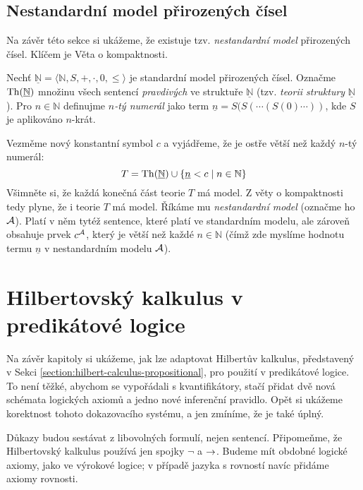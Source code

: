 \subsection{Nestandardní model přirozených čísel}

Na závěr této sekce si ukážeme, že existuje tzv. \emph{nestandardní model} přirozených čísel. Klíčem je Věta o kompaktnosti.
    
Nechť $\underline{\mathbb N}=\langle\mathbb N,S,+,\cdot,0,\leq\rangle$ je standardní model přirozených čísel. Označme $\operatorname{Th}(\underline{\mathbb N})$ množinu všech sentencí \emph{pravdivých} ve struktuře $\underline{\mathbb N}$ (tzv. \emph{teorii struktury} $\underline{\mathbb N}$). Pro $n\in \mathbb N$ definujme \emph{$n$-tý numerál} jako term $\underline n=S(S(\cdots (S(0)\cdots))$, kde $S$ je aplikováno $n$-krát.

Vezměme nový konstantní symbol $c$ a vyjádřeme, že je ostře větší než každý $n$-tý numerál:
$$
T=\operatorname{Th}(\underline{\mathbb N})\cup\{\underline n<c\mid n\in \mathbb N\}
$$
Všimněte si, že každá konečná část teorie $T$ má model. Z věty o kompaktnosti tedy plyne, že i teorie $T$ má model. Říkáme mu \emph{nestandardní model} (označme ho $\mathcal{A}$). Platí v něm tytéž sentence, které platí ve standardním modelu, ale zároveň obsahuje prvek $c^{\mathcal{A}}$, který je větší než každé $n\in \mathbb N$ (čímž zde myslíme hodnotu termu $\underline n$ v nestandardním modelu $\mathcal{A}$).
    

\section{Hilbertovský kalkulus v predikátové logice}

Na závěr kapitoly si ukážeme, jak lze adaptovat Hilbertův kalkulus, představený v Sekci \ref{section:hilbert-calculus-propositional}, pro použití v predikátové logice. To není těžké, abychom se vypořádali s kvantifikátory, stačí přidat dvě nová schémata logických axiomů a jedno nové inferenční pravidlo. Opět si ukážeme korektnost tohoto dokazovacího systému, a jen zmíníme, že je také úplný.

Důkazy budou sestávat z libovolných formulí, nejen sentencí. Připomeňme, že Hilbertovský kalkulus používá jen spojky $\neg$ a ${\mathbin{\rightarrow}}$. Budeme mít obdobné logické axiomy, jako ve výrokové logice; v případě jazyka s rovností navíc přidáme \alert{axiomy rovnosti}. 

